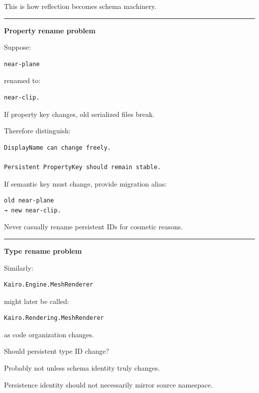 This is how reflection becomes schema machinery.

\begin{center}\rule{0.5\linewidth}{0.5pt}\end{center}

\textbf{Property rename problem}

Suppose:

\begin{verbatim}
near-plane
\end{verbatim}

renamed to:

\begin{verbatim}
near-clip.
\end{verbatim}

If property key changes, old serialized files break.

Therefore distinguish:

\begin{verbatim}
DisplayName can change freely.

Persistent PropertyKey should remain stable.
\end{verbatim}

If semantic key must change, provide migration alias:

\begin{verbatim}
old near-plane
→ new near-clip.
\end{verbatim}

Never casually rename persistent IDs for cosmetic reasons.

\begin{center}\rule{0.5\linewidth}{0.5pt}\end{center}

\textbf{Type rename problem}

Similarly:

\begin{verbatim}
Kairo.Engine.MeshRenderer
\end{verbatim}

might later be called:

\begin{verbatim}
Kairo.Rendering.MeshRenderer
\end{verbatim}

as code organization changes.

Should persistent type ID change?

Probably not unless schema identity truly changes.

Persistence identity should not necessarily mirror source namespace.


